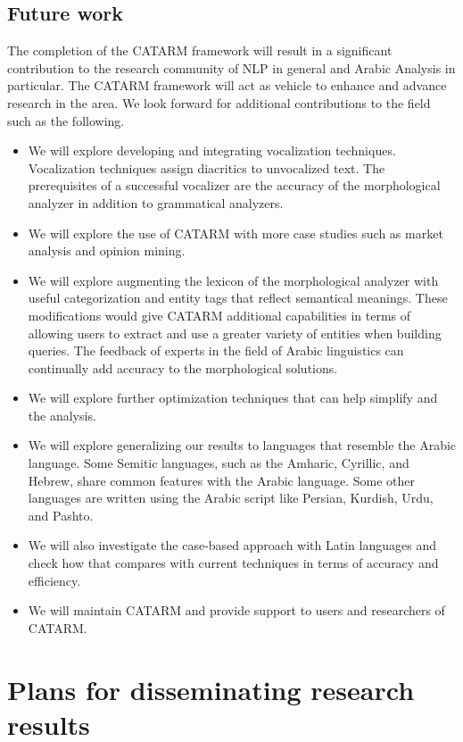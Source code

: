 \documentclass[12pt]{article}
\begin{document}
\subsection{Future work}

The completion of the CATARM framework will result in a 
significant contribution to the research community of 
NLP in general and Arabic Analysis in particular. 
The CATARM framework will act as vehicle to enhance and advance 
research in the area. 
We look forward for additional contributions to the field 
such as the following.
\begin{itemize}
\item We will explore developing and integrating vocalization
techniques. 
Vocalization techniques assign diacritics to unvocalized text. 
The prerequisites of a successful vocalizer are the accuracy of 
the morphological analyzer in addition to grammatical analyzers. 
\item We will explore the use of CATARM with more case studies
such as market analysis and opinion mining.
\item We will explore augmenting the lexicon of the
morphological analyzer with useful categorization and entity 
tags that reflect semantical meanings. 
These modifications would give CATARM additional capabilities in 
terms of allowing users to extract and use a greater variety of 
entities when building queries. 
The feedback of experts in the field of Arabic linguistics can 
continually add accuracy to the morphological solutions.  
\item We will explore further optimization techniques
that can help simplify and the analysis. 
\item We will explore generalizing our results to languages 
that resemble the Arabic language. 
Some Semitic languages, such as the Amharic, Cyrillic, and Hebrew,
share common features with the Arabic 
language. Some other languages are written using the 
Arabic script like Persian, Kurdish, Urdu, and Pashto. 
\item We will also investigate the case-based approach with
Latin languages and check how that compares with current techniques
in terms of accuracy and efficiency.
\item We will maintain CATARM and provide support to users and 
researchers of CATARM.
\end{itemize}


\section{Plans for disseminating research results}
\label{s:dissem}
\end{document}

